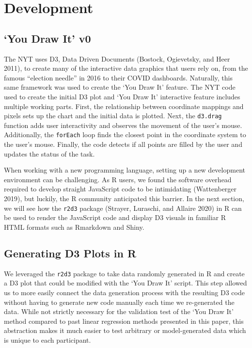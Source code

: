 \documentclass[
]{jds}
\begin{document}
\hypertarget{development}{%
\section{Development}\label{development}}

\hypertarget{you-draw-it-v0}{%
\subsection{`You Draw It' v0}\label{you-draw-it-v0}}

The NYT uses D3, Data Driven Documents (Bostock, Ogievetsky, and Heer
2011), to create many of the interactive data graphics that users rely
on, from the famous ``election needle'' in 2016 to their COVID
dashboards. Naturally, this same framework was used to create the `You
Draw It' feature. The NYT code used to create the initial D3 plot and
`You Draw It' interactive feature includes multiple working parts.
First, the relationship between coordinate mappings and pixels sets up
the chart and the initial data is plotted. Next, the \texttt{d3.drag}
function adds user interactivity and observes the movement of the user's
mouse. Additionally, the \texttt{forEach} loop finds the closest point
in the coordinate system to the user's mouse. Finally, the code detects
if all points are filled by the user and updates the status of the task.

When working with a new programming language, setting up a new
development environment can be challenging. As R users, we found the
software overhead required to develop straight JavaScript code to be
intimidating (Wattenberger 2019), but luckily, the R community
anticipated this barrier. In the next section, we will see how the
\texttt{r2d3} package (Strayer, Luraschi, and Allaire 2020) in R can be
used to render the JavaScript code and display D3 visuals in familiar R
HTML formats such as Rmarkdown and Shiny.

\hypertarget{generating-d3-plots-in-r}{%
\subsection{Generating D3 Plots in R}\label{generating-d3-plots-in-r}}

We leveraged the \texttt{r2d3} package to take data randomly generated
in R and create a D3 plot that could be modified with the `You Draw It'
script. This step allowed us to more easily connect the data generation
process with the resulting D3 code without having to generate new code
manually each time we re-generated the data. While not strictly
necessary for the validation test of the `You Draw It' method compared
to past linear regression methods presented in this paper, this
abstraction makes it much easier to test arbitrary or model-generated
data which is unique to each participant.
\end{document}
